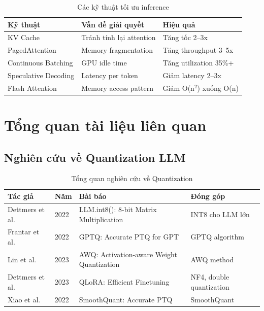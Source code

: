 \documentclass[12pt,a4paper]{report}
\begin{document}
\begin{table}[h]
\centering
\caption{Các kỹ thuật tối ưu inference}
\label{tab:inference-tech}
\begin{tabular}{p{3.5cm}p{4cm}p{3cm}}
\toprule
\textbf{Kỹ thuật} & \textbf{Vấn đề giải quyết} & \textbf{Hiệu quả} \\
\midrule
KV Cache & Tránh tính lại attention & Tăng tốc 2--3x \\
PagedAttention & Memory fragmentation & Tăng throughput 3--5x \\
Continuous Batching & GPU idle time & Tăng utilization 35\%+ \\
Speculative Decoding & Latency per token & Giảm latency 2--3x \\
Flash Attention & Memory access pattern & Giảm O(n$^2$) xuống O(n) \\
\bottomrule
\end{tabular}
\end{table}

\section{Tổng quan tài liệu liên quan}

\subsection{Nghiên cứu về Quantization LLM}

\begin{table}[h]
\centering
\caption{Tổng quan nghiên cứu về Quantization}
\label{tab:lit-quant}
\begin{tabular}{p{2.5cm}p{1.5cm}p{5cm}p{3.5cm}}
\toprule
\textbf{Tác giả} & \textbf{Năm} & \textbf{Bài báo} & \textbf{Đóng góp} \\
\midrule
Dettmers et al. & 2022 & LLM.int8(): 8-bit Matrix Multiplication & INT8 cho LLM lớn \\
Frantar et al. & 2022 & GPTQ: Accurate PTQ for GPT & GPTQ algorithm \\
Lin et al. & 2023 & AWQ: Activation-aware Weight Quantization & AWQ method \\
Dettmers et al. & 2023 & QLoRA: Efficient Finetuning & NF4, double quantization \\
Xiao et al. & 2022 & SmoothQuant: Accurate PTQ & SmoothQuant \\
\bottomrule
\end{tabular}
\end{table}
\end{document}
